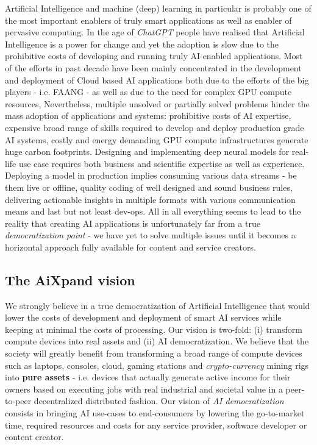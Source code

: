 \documentclass{article}
\begin{document}
Artificial Intelligence and machine (deep) learning in particular is probably one of the most important enablers of truly smart applications as well as enabler of pervasive computing. In the age of \textit{ChatGPT} people have realised that Artificial Intelligence is a power for change and yet the adoption is slow due to the prohibitive costs of developing and running truly AI-enabled applications.
Most of the efforts in past decade have been mainly concentrated in the development and deployment of Cloud based AI applications both due to the efforts of the big players - i.e. FAANG\cite{pisal2021rise} - as well as due to the need for complex GPU compute resources, Nevertheless, multiple  unsolved or partially solved problems hinder the mass adoption of applications and systems: prohibitive costs of AI expertise, expensive broad range of skills required to develop and deploy production grade AI systems, costly and energy demanding GPU compute infrastructures generate huge carbon footprints. Designing and implementing deep neural models for real-life use case  requires both business and scientific expertise as well as experience. Deploying a model in production implies consuming various data streams - be them live or offline, quality coding of well designed and sound business rules, delivering actionable insights in multiple formats with various communication means and last but not least dev-ops. All in all everything seems to lead to the reality that creating AI applications is unfortunately far from a true \emph{democratization point} - we have yet to solve multiple issues until it becomes a horizontal approach fully available for content and service creators. 

\subsection{The AiXpand vision}
We strongly believe in a true democratization of Artificial Intelligence that would lower the costs of development and deployment of smart AI services while keeping at minimal the costs of processing. Our vision is two-fold: (i) transform compute devices into real assets and (ii) AI democratization. We believe that the society will greatly benefit from transforming a broad range of compute devices such as laptops, consoles, cloud, gaming stations and \emph{crypto-currency} mining rigs into \textbf{pure assets} - i.e. devices that actually generate active income for their owners based on executing jobs with real industrial and societal value in a peer-to-peer decentralized distributed fashion. Our vision of \textit{AI democratization} consists in bringing AI use-cases to end-consumers by lowering the go-to-market time, required resources and costs for any service provider, software developer or content creator.
\end{document}
